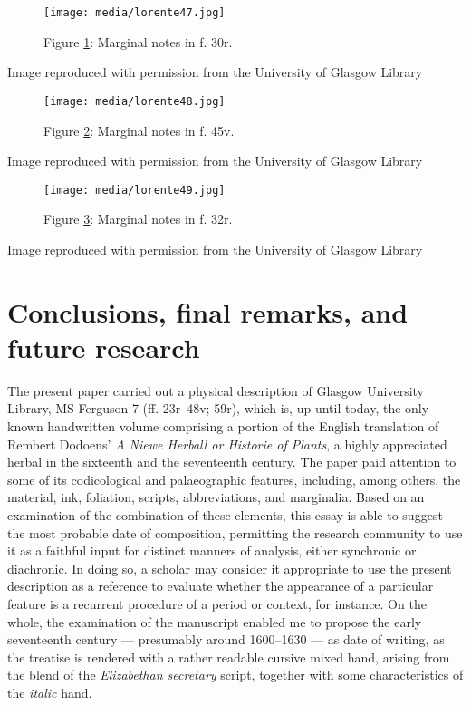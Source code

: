 \documentclass{article}
\begin{document}
\begin{figure}[H]
  \centering
    \texttt{[image: media/lorente47.jpg]}
    \caption{Figure \ref{fig:lorente47}: Marginal notes in f. 30r.}
    \label{fig:lorente47}
    \end{figure}


 Image reproduced with permission from the University of Glasgow Library 


 
\begin{figure}[H]
  \centering
    \texttt{[image: media/lorente48.jpg]}
    \caption{Figure \ref{fig:lorente48}: Marginal notes in f. 45v.}
    \label{fig:lorente48}
    \end{figure}


 Image reproduced with permission from the University of Glasgow Library 


 
\begin{figure}[H]
  \centering
    \texttt{[image: media/lorente49.jpg]}
    \caption{Figure \ref{fig:lorente49}: Marginal notes in f. 32r.}
    \label{fig:lorente49}
    \end{figure}


 Image reproduced with permission from the University of Glasgow Library 


 
\section{Conclusions, final remarks, and future research}
The present paper carried out a physical description of Glasgow
University Library, MS Ferguson 7 (ff. 23r--48v; 59r), which is, up until
today, the only known handwritten volume comprising a portion of the
English translation of Rembert Dodoens' \emph{A Niewe Herball or
Historie of Plants}, a highly appreciated herbal in the sixteenth and
the seventeenth century. The paper paid attention to some of its
codicological and palaeographic features, including, among others, the
material, ink, foliation, scripts, abbreviations, and marginalia. Based on an examination of the combination of these elements, this essay is able to suggest the most probable date of composition, permitting the research community to use it as a faithful input for distinct
manners of analysis, either synchronic or diachronic. In doing so, a
scholar may consider it appropriate to use the present description as a
reference to evaluate whether the appearance of a particular feature is
a recurrent procedure of a period or context, for instance. On the
whole, the examination of the manuscript enabled me to propose the early seventeenth century –– presumably around 1600--1630 –– as date of writing, as the treatise is
rendered with a rather readable cursive mixed hand, arising from the
blend of the \emph{Elizabethan secretary} script, together with some
characteristics of the \emph{italic} hand.
\end{document}
